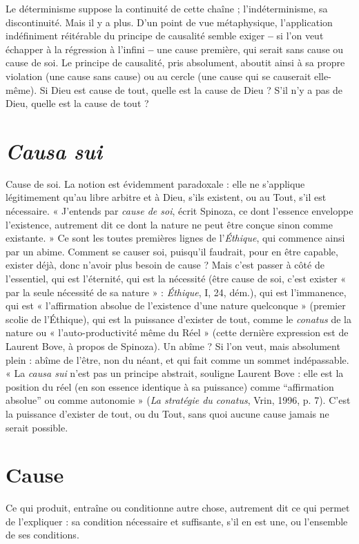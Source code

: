 Le déterminisme suppose la continuité de cette chaîne ; l’indéterminisme, sa
discontinuité. Mais il y a plus. D’un point de vue métaphysique, l’application
indéfiniment réitérable du principe de causalité semble exiger {\bf --} si l’on veut
échapper à la régression à l’infini {\bf --} une cause première, qui serait sans cause ou
cause de soi. Le principe de causalité, pris absolument, aboutit ainsi à sa propre
violation (une cause sans cause) ou au cercle (une cause qui se causerait elle-même).
Si Dieu est cause de tout, quelle est la cause de Dieu ? S’il n’y a pas de
Dieu, quelle est la cause de tout ?

\section{\it Causa sui}
Cause de soi. La notion est évidemment paradoxale : elle ne
s'applique légitimement qu’au libre arbitre et à Dieu, s’ils existent,
ou au Tout, s’il est nécessaire. « J'entends par {\it cause de soi}, écrit Spinoza,
ce dont l’essence enveloppe l'existence, autrement dit ce dont la nature ne peut
être conçue sinon comme existante. » Ce sont les toutes premières lignes de
l’{\it Éthique}, qui commence ainsi par un abime. Comment se causer soi, puisqu'il
faudrait, pour en être capable, exister déjà, donc n’avoir plus besoin de cause ?
Mais c’est passer à côté de l'essentiel, qui est l’éternité, qui est la nécessité (être
cause de soi, c’est exister « par la seule nécessité de sa nature » : {\it Éthique}, I, 24,
dém.), qui est l’immanence, qui est « l'affirmation absolue de l’existence d’une
nature quelconque » (premier scolie de l’Éthique), qui est la puissance d’exister
de tout, comme le {\it conatus} de la nature ou « l’auto-productivité même du Réel »
(cette dernière expression est de Laurent Bove, à propos de Spinoza). Un
abîme ? Si l’on veut, mais absolument plein : abîme de l'être, non du néant, et
qui fait comme un sommet indépassable. « La {\it causa sui} n’est pas un principe
abstrait, souligne Laurent Bove : elle est la position du réel (en son essence
identique à sa puissance) comme “affirmation absolue” ou comme autonomie »
({\it La stratégie du conatus}, Vrin, 1996, p. 7). C’est la puissance d’exister de tout,
ou du Tout, sans quoi aucune cause jamais ne serait possible.

\section{Cause}
Ce qui produit, entraîne ou conditionne autre chose, autrement dit
ce qui permet de l'expliquer : sa condition nécessaire et suffisante,
s’il en est une, ou l’ensemble de ses conditions.

